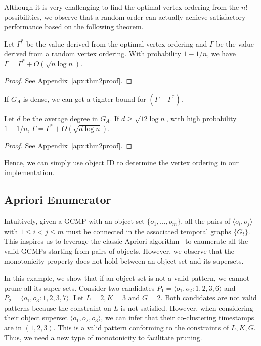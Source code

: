Although it is very challenging to find the optimal vertex ordering from the $n!$ possibilities, we observe that a random order can actually achieve satisfactory performance based on the following theorem.


\begin{theorem}
\label{THM:SPM_LB}
Let $\Gamma^*$ be the value derived from the optimal vertex ordering and  $\Gamma$ be the value derived from a random vertex ordering. With probability $1-1/n$, we have $\Gamma = \Gamma^* + O(\sqrt{n \log n})$.
\end{theorem}
\begin{proof}
   \vspace{-0.5em}
See Appendix~\ref{apx:thm2proof}.
\end{proof}
If $G_A$ is dense, we can get a tighter bound for $(\Gamma - \Gamma^*)$.
\begin{theorem}
\label{THM:SPM_LB_INC}
Let $d$ be the average degree in $G_A$. If $d\geq \sqrt{12\log n}$, with
high probability $1-1/n$, $\Gamma = \Gamma^* + O(\sqrt{d\log n})$.
\end{theorem}
\begin{proof}
 \vspace{-0.5em}
See Appendix~\ref{apx:thm2proof}.
\end{proof}
Hence, we can simply use object ID to determine the vertex ordering in our implementation.


\subsection{Apriori Enumerator}
Intuitively, given a GCMP with an object set $\{o_1,\ldots,o_m\}$, 
all the pairs of $\langle o_i,o_j \rangle$ with $1\leq i<j\leq m$ must 
be connected in the associated temporal graphs $\{G_t\}$. This inspires us to leverage the classic Apriori algorithm~\cite{agrawal1994fast} to enumerate all the valid GCMPs starting from pairs of objects. However, we observe that the monotonicity property does not hold between an object set and its supersets.

\begin{example}
In this example, we show that if an object set is not a valid pattern, we cannot prune all its super sets.
Consider two candidates $P_1=\langle o_1,o_2:1,2,3,6 \rangle$ and $P_2=\langle o_1,o_3:1,2,3,7 \rangle$. 
Let $L=2,K=3$ and $G=2$. Both candidates are not valid patterns because the constraint on $L$ is not satisfied. 
However, when considering their object superset $\langle o_1,o_2,o_3 \rangle$, we can infer that their co-clustering timestamps are in $(1,2,3)$. This is a valid pattern conforming to the constraints of $L,K,G$. Thus, we need a new type of monotonicity to facilitate pruning.
\end{example}   


